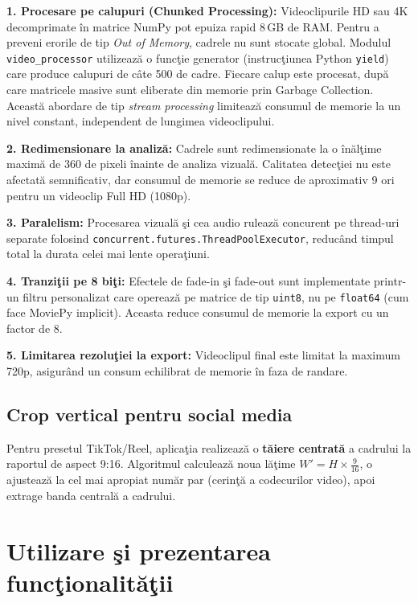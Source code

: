 \documentclass[12pt,a4paper]{article}
\begin{document}
\textbf{1. Procesare pe calupuri (Chunked Processing):} Videoclipurile HD sau 4K decomprimate \^{i}n matrice NumPy pot epuiza rapid 8\,GB de RAM. Pentru a preveni erorile de tip \textit{Out of Memory}, cadrele nu sunt stocate global. Modulul \texttt{video\_processor} utilizeaz\u{a}{} o func\c{t}ie generator (instruc\c{t}iunea Python \texttt{yield}) care produce calupuri de c\^{a}te 500 de cadre. Fiecare calup este procesat, dup\u{a}{} care matricele masive sunt eliberate din memorie prin Garbage Collection. Aceast\u{a}{} abordare de tip \textit{stream processing} limiteaz\u{a}{} consumul de memorie la un nivel constant, independent de lungimea videoclipului.

\textbf{2. Redimensionare la analiz\u{a}:} Cadrele sunt redimensionate la o \^{i}n\u{a}l\c{t}ime maxim\u{a}{} de 360 de pixeli \^{i}nainte de analiza vizual\u{a}. Calitatea detec\c{t}iei nu este afectat\u{a}{} semnificativ, dar consumul de memorie se reduce de aproximativ 9 ori pentru un videoclip Full HD (1080p).

\textbf{3. Paralelism:} Procesarea vizual\u{a}{} \c{s}i cea audio ruleaz\u{a}{} concurent pe thread-uri separate folosind \texttt{concurrent.futures.ThreadPoolExecutor}, reduc\^{a}nd timpul total la durata celei mai lente opera\c{t}iuni.

\textbf{4. Tranzi\c{t}ii pe 8 bi\c{t}i:} Efectele de fade-in \c{s}i fade-out sunt implementate printr-un filtru personalizat care opereaz\u{a}{} pe matrice de tip \texttt{uint8}, nu pe \texttt{float64} (cum face MoviePy implicit). Aceasta reduce consumul de memorie la export cu un factor de 8.

\textbf{5. Limitarea rezolu\c{t}iei la export:} Videoclipul final este limitat la maximum 720p, asigur\^{a}nd un consum echilibrat de memorie \^{i}n faza de randare.

\subsection{Crop vertical pentru social media}

Pentru presetul TikTok/Reel, aplica\c{t}ia realizeaz\u{a}{} o \textbf{t\u{a}iere centrat\u{a}} a cadrului la raportul de aspect 9:16. Algoritmul calculeaz\u{a}{} noua l\u{a}\c{t}ime $W' = H \times \frac{9}{16}$, o ajusteaz\u{a}{} la cel mai apropiat num\u{a}r par (cerin\c{t}\u{a}{} a codecurilor video), apoi extrage banda central\u{a}{} a cadrului.


\section{Utilizare \c{s}i prezentarea func\c{t}ionalit\u{a}\c{t}ii}
\end{document}
